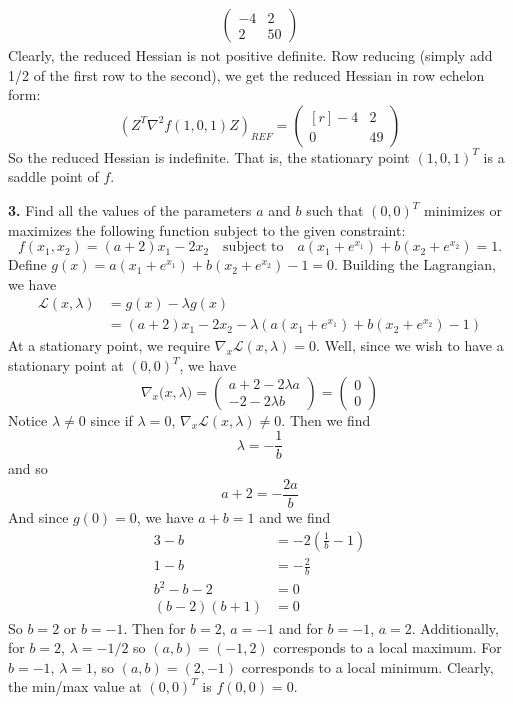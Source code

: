 \documentclass{article}
\begin{document}
\begin{itemize}
\begin{align*}
\begin{pmatrix*}
            -4 & 2\\
            2 & 50
        \end{pmatrix*}
    \end{align*}
    Clearly, the reduced Hessian is not positive definite. Row reducing (simply add 1/2 of the first row to the second), we get the reduced Hessian in row echelon form:
    \[(Z^T\nabla^2f(1,0,1)Z)_{REF} = \begin{pmatrix*}[r]
        -4 & 2\\
        0 & 49
    \end{pmatrix*}\]
    So the reduced Hessian is indefinite. That is, the stationary point $(1,0,1)^T$ is a saddle point of $f$.
\end{itemize}
\textbf{3.} Find all the values of the parameters $a$ and $b$ such that $(0,0)^T$ minimizes or maximizes the following function subject to the given constraint:
\[f(x_1,x_2) = (a + 2)x_1 - 2x_2 \hspace{1em} \text{subject to} \hspace{1em} a(x_1 + e^{x_1}) + b(x_2 + e^{x_2}) = 1.\]
Define $g(x) = a(x_1 + e^{x_1}) + b(x_2 + e^{x_2}) - 1 = 0$. Building the Lagrangian, we have 
\begin{align*}
    \mathscr{L}(x,\lambda) &= g(x) - \lambda g(x)\\
    &= (a+2)x_1 - 2x_2 - \lambda(a(x_1 + e^{x_1}) + b(x_2 + e^{x_2}) - 1)
\end{align*}
At a stationary point, we require $\nabla_x\mathscr{L}(x,\lambda) = 0$. Well, since we wish to have a stationary point at $(0,0)^T$, we have
\[\nabla_x\mathscr(x,\lambda) = \begin{pmatrix*}
    a+2 - 2\lambda a\\
    -2 - 2\lambda b
\end{pmatrix*}
=
\begin{pmatrix}
    0\\
    0
\end{pmatrix}\]
Notice $\lambda \neq 0$ since if $\lambda = 0$, $\nabla_x\mathscr{L}(x,\lambda) \neq 0$. Then we find
\[\lambda = -\frac{1}{b}\]
and so 
\[a + 2 = -\frac{2a}{b}\]
And since $g(0) = 0$, we have $a + b = 1$ and we find 
\begin{align*}
    3 - b &= -2\left(\frac{1}{b} - 1\right)\\
    1 - b &= -\frac{2}{b}\\
    b^2 - b - 2  &= 0\\
    (b-2)(b+1) &= 0
\end{align*}
So $b = 2$ or $b = -1$. Then for $b = 2$, $a = -1$ and for $b = -1$, $a = 2$. Additionally, for $b = 2$, $\lambda = -1/2$ so $(a,b) = (-1,2)$ corresponds to a local maximum. For $b = -1$, $\lambda = 1$, so $(a,b) = (2,-1)$ corresponds to a local minimum. Clearly, the min/max value at $(0,0)^T$ is $f(0,0) = 0$.
\end{document}
